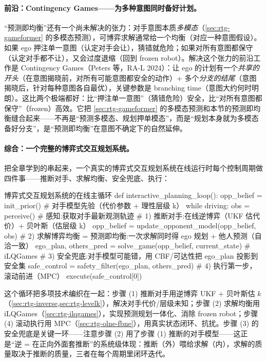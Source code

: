 \paragraph{前沿：Contingency Games——为多种意图同时备好计划。}
“预测即均衡”还有一个尚未解决的张力：对手意图本质\emph{多模态}（\cref{sec:rtg-gameformer} 的多模态预测），可博弈求解通常给一个均衡（对应一种意图假设）。如果 ego 押注单一意图（认定对手会让），猜错就危险；如果对所有意图都保守（认定对手都不让），又会过度退缩（回到 frozen robot）。解决这个张力的前沿工作是 Contingency Games（Peters 等，RA-L 2024）\cite{peters2024contingency}：让 ego 的计划有一个\emph{共享的开头}（在意图揭晓前，对所有可能意图都安全的动作）+ 多个\emph{分支的结尾}（意图揭晓后，针对每种意图各自最优），关键参数是 branching time（意图大约何时明朗）。这比两个极端都好：比“押注单一意图”（猜错危险）安全，比“对所有意图都保守”（frozen）高效。它把 \cref{sec:rtg-gameformer} 的多模态预测和本节的预测即均衡缝合起来——不再是“预测多模态、规划押单模态”，而是“规划本身就为多模态备好分支”，是“预测即均衡”在意图不确定下的自然延伸。

\paragraph{综合：一个完整的博弈式交互规划系统。}
把全章学到的串起来，一个真实的博弈式交互规划系统在线运行时每个控制周期做四件事——推断对手、求解均衡、安全兜底、执行：

\begin{codebox}[Python]{博弈式交互规划系统的在线主循环}
def interactive_planning_loop():
    opp_belief = init_prior()              # 对手模型先验（代价参数 + 理性层级 k）
    while driving:
        obs = perceive()                   # 感知:获取对手最新观测轨迹
        # 1) 推断对手:在线逆博弈（UKF 估代价）+ 贝叶斯（估层级 k）
        opp_belief = update_opponent_model(opp_belief, obs)
        # 2) 求解博弈均衡 = 预测即均衡:一次求解同时得 ego 规划 + 他人预测（自洽一致）
        ego_plan, others_pred = solve_game(opp_belief, current_state)   # iLQGames
        # 3) 安全兜底:对手模型可能错，用 CBF/可达性把 ego_plan 投影到安全集
        safe_control = safety_filter(ego_plan, others_pred)
        # 4) 执行第一步，滚动前进（MPC）
        execute(safe_control[0])
\end{codebox}

\noindent 这个循环把多项技术编织在一起：步骤 (1) 推断对手用逆博弈 UKF + 贝叶斯估 $k$（\cref{sec:rtg-inverse,sec:rtg-levelk}），解决对手代价/层级未知；步骤 (2) 求解均衡用 iLQGames（\cref{sec:rtg-ilqgames}），实现预测规划一体化、消除 frozen robot；步骤 (4) 滚动执行用 MPC（\cref{sec:rtg-olne-fbne}），用真实状态闭环、抗扰。步骤 (3) 的安全兜底是关键一环——注意步骤 (2) 用了步骤 (1) 推断的对手模型——这正是“逆 = 在正向外面套推断”的系统级体现：推断（外）喂给求解（内），求解的质量取决于推断的质量，三者在每个周期里闭环迭代。

